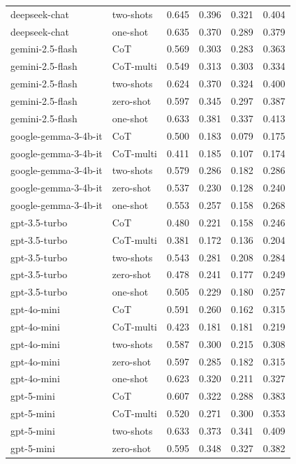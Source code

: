 \begin{tabular}{llrrrr}
deepseek-chat & two-shots & 0.645 & 0.396 & 0.321 & 0.404 \\
deepseek-chat & one-shot & 0.635 & 0.370 & 0.289 & 0.379 \\
gemini-2.5-flash & CoT & 0.569 & 0.303 & 0.283 & 0.363 \\
gemini-2.5-flash & CoT-multi & 0.549 & 0.313 & 0.303 & 0.334 \\
gemini-2.5-flash & two-shots & 0.624 & 0.370 & 0.324 & 0.400 \\
gemini-2.5-flash & zero-shot & 0.597 & 0.345 & 0.297 & 0.387 \\
gemini-2.5-flash & one-shot & 0.633 & 0.381 & 0.337 & 0.413 \\
google-gemma-3-4b-it & CoT & 0.500 & 0.183 & 0.079 & 0.175 \\
google-gemma-3-4b-it & CoT-multi & 0.411 & 0.185 & 0.107 & 0.174 \\
google-gemma-3-4b-it & two-shots & 0.579 & 0.286 & 0.182 & 0.286 \\
google-gemma-3-4b-it & zero-shot & 0.537 & 0.230 & 0.128 & 0.240 \\
google-gemma-3-4b-it & one-shot & 0.553 & 0.257 & 0.158 & 0.268 \\
gpt-3.5-turbo & CoT & 0.480 & 0.221 & 0.158 & 0.246 \\
gpt-3.5-turbo & CoT-multi & 0.381 & 0.172 & 0.136 & 0.204 \\
gpt-3.5-turbo & two-shots & 0.543 & 0.281 & 0.208 & 0.284 \\
gpt-3.5-turbo & zero-shot & 0.478 & 0.241 & 0.177 & 0.249 \\
gpt-3.5-turbo & one-shot & 0.505 & 0.229 & 0.180 & 0.257 \\
gpt-4o-mini & CoT & 0.591 & 0.260 & 0.162 & 0.315 \\
gpt-4o-mini & CoT-multi & 0.423 & 0.181 & 0.181 & 0.219 \\
gpt-4o-mini & two-shots & 0.587 & 0.300 & 0.215 & 0.308 \\
gpt-4o-mini & zero-shot & 0.597 & 0.285 & 0.182 & 0.315 \\
gpt-4o-mini & one-shot & 0.623 & 0.320 & 0.211 & 0.327 \\
gpt-5-mini & CoT & 0.607 & 0.322 & 0.288 & 0.383 \\
gpt-5-mini & CoT-multi & 0.520 & 0.271 & 0.300 & 0.353 \\
gpt-5-mini & two-shots & 0.633 & 0.373 & 0.341 & 0.409 \\
gpt-5-mini & zero-shot & 0.595 & 0.348 & 0.327 & 0.382 \\

\end{tabular}

